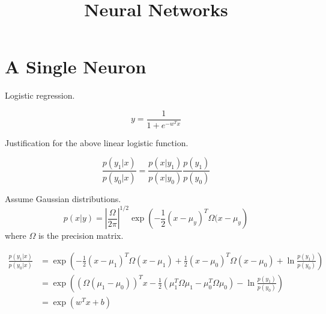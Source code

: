 \documentclass{article}
\begin{document}
\title{Neural Networks}
\author{}
\date{}
\maketitle

\section{A Single Neuron}

Logistic regression.

\begin{equation}
y = \frac{1}{1 + e^{-w^T x}}
\end{equation}

Justification for the above linear logistic function.

\begin{equation}
\frac{p(y_1 | x)}{p(y_0 | x)} = \frac{p(x | y_1)}{p(x | y_0)} \frac{p(y_1)}{p(y_0)}
\end{equation}

Assume Gaussian distributions.
\begin{equation}
p(x | y) = \left|\frac{\Omega}{2\pi}\right|^{1/2} \exp\left(-\frac{1}{2}(x-\mu_y)^T\Omega(x-\mu_y\right)
\end{equation}
where $\Omega$ is the precision matrix.

\begin{align}
\frac{p(y_1 | x)}{p(y_0 | x)} &= \exp\left(-\frac{1}{2}(x-\mu_1)^T\Omega(x-\mu_1) + \frac{1}{2}(x-\mu_0)^T\Omega(x-\mu_0) + \ln \frac{p(y_1)}{p(y_0)}\right) \\
& =  \exp\left((\Omega(\mu_1-\mu_0))^Tx -\frac{1}{2}(\mu_1^T\Omega\mu_1 - \mu_0^T\Omega\mu_0) - \ln \frac{p(y_1)}{p(y_0)}\right) \\
& =  \exp(w^Tx + b)
\end{align}
\end{document}
